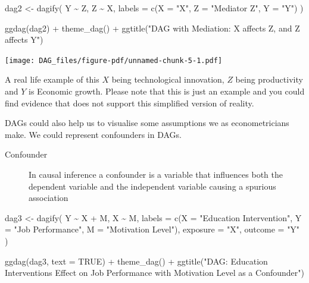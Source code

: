 \documentclass[
  letterpaper,
  DIV=11,
  numbers=noendperiod]{scrreprt}
\newenvironment{Shaded}{\begin{snugshade}}{\end{snugshade}}
\newcommand{\AttributeTok}[1]{\textcolor[rgb]{0.40,0.45,0.13}{#1}}
\newcommand{\ConstantTok}[1]{\textcolor[rgb]{0.56,0.35,0.01}{#1}}
\newcommand{\FunctionTok}[1]{\textcolor[rgb]{0.28,0.35,0.67}{#1}}
\newcommand{\NormalTok}[1]{\textcolor[rgb]{0.00,0.23,0.31}{#1}}
\newcommand{\OtherTok}[1]{\textcolor[rgb]{0.00,0.23,0.31}{#1}}
\newcommand{\SpecialCharTok}[1]{\textcolor[rgb]{0.37,0.37,0.37}{#1}}
\newcommand{\StringTok}[1]{\textcolor[rgb]{0.13,0.47,0.30}{#1}}
\theoremstyle{definition}
\theoremstyle{remark}
\begin{document}
\begin{Shaded}
\begin{Highlighting}[]
\NormalTok{dag2 }\OtherTok{\textless{}{-}} \FunctionTok{dagify}\NormalTok{(}
\NormalTok{  Y }\SpecialCharTok{\textasciitilde{}}\NormalTok{ Z,}
\NormalTok{  Z }\SpecialCharTok{\textasciitilde{}}\NormalTok{ X,}
  \AttributeTok{labels =} \FunctionTok{c}\NormalTok{(}\AttributeTok{X =} \StringTok{"X"}\NormalTok{, }\AttributeTok{Z =} \StringTok{"Mediator Z"}\NormalTok{, }\AttributeTok{Y =} \StringTok{"Y"}\NormalTok{)}
\NormalTok{)}

\FunctionTok{ggdag}\NormalTok{(dag2) }\SpecialCharTok{+} 
  \FunctionTok{theme\_dag}\NormalTok{() }\SpecialCharTok{+}
  \FunctionTok{ggtitle}\NormalTok{(}\StringTok{"DAG with Mediation: X affects Z, and Z affects Y"}\NormalTok{)}
\end{Highlighting}
\end{Shaded}

\texttt{[image: DAG\_files/figure-pdf/unnamed-chunk-5-1.pdf]}

A real life example of this \(X\) being technological innovation, \(Z\)
being productivity and \(Y\) is Economic growth. Please note that this
is just an example and you could find evidence that does not support
this simplified version of reality.

DAGs could also help us to visualise some assumptions we as
econometricians make. We could represent confounders in DAGs.

\begin{description}
\item[Confounder]
In causal inference a confounder is a variable that influences both the
dependent variable and the independent variable causing a spurious
association
\end{description}

\begin{Shaded}
\begin{Highlighting}[]
\NormalTok{dag3 }\OtherTok{\textless{}{-}} \FunctionTok{dagify}\NormalTok{(}
\NormalTok{  Y }\SpecialCharTok{\textasciitilde{}}\NormalTok{ X }\SpecialCharTok{+}\NormalTok{ M,}
\NormalTok{  X }\SpecialCharTok{\textasciitilde{}}\NormalTok{ M,}
  \AttributeTok{labels =} \FunctionTok{c}\NormalTok{(}\AttributeTok{X =} \StringTok{"Education Intervention"}\NormalTok{, }\AttributeTok{Y =} \StringTok{"Job Performance"}\NormalTok{, }\AttributeTok{M =} \StringTok{"Motivation Level"}\NormalTok{),}
  \AttributeTok{exposure =} \StringTok{"X"}\NormalTok{,}
  \AttributeTok{outcome =} \StringTok{"Y"}
\NormalTok{)}

\FunctionTok{ggdag}\NormalTok{(dag3, }\AttributeTok{text =} \ConstantTok{TRUE}\NormalTok{) }\SpecialCharTok{+}  
  \FunctionTok{theme\_dag}\NormalTok{() }\SpecialCharTok{+}
  \FunctionTok{ggtitle}\NormalTok{(}\StringTok{"DAG: Education Intervention\textquotesingle{}s Effect on Job Performance with Motivation Level as a Confounder"}\NormalTok{)}
\end{Highlighting}
\end{Shaded}
\end{document}
